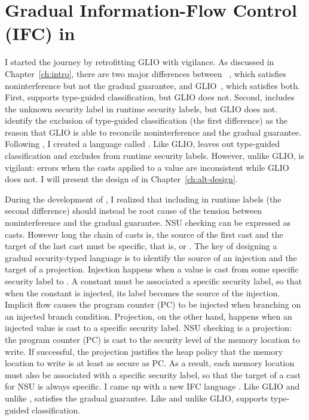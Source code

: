 \chapter{Gradual Information-Flow Control (IFC) in \Surface}
\label{ch:examples}

{\color{NavyBlue} %
I started the journey by retrofitting GLIO with vigilance. As discussed in
Chapter~\ref{ch:intro}, there are two major differences between
\GSLRef~\parencite{Toro:2018aa}, which satisfies noninterference but not the
gradual guarantee, and GLIO~\parencite{Amorim:2020aa}, which satisfies both.
First, \GSLRef supports type-guided classification, but GLIO does not. Second,
\GSLRef includes the unknown security label \unk in runtime security labels, but
GLIO does not. \textcite{Amorim:2020aa} identify the exclusion of type-guided
classification (the first difference) as the reason that GLIO is able to
reconcile noninterference and the gradual guarantee. Following
\textcite{Amorim:2020aa}, I created a language called \SurfaceOld. Like GLIO,
\SurfaceOld leaves out type-guided classification and excludes \unk from runtime
security labels. However, unlike GLIO, \SurfaceOld is vigilant: \SurfaceOld
errors when the casts applied to a value are inconsistent while GLIO does not. I
will present the design of \SurfaceOld in Chapter~\ref{ch:alt-design}.

During the development of \SurfaceOld, I realized that including \unk in runtime
labels (the second difference) should instead be root cause of the tension
between noninterference and the gradual guarantee. NSU checking can be expressed
as casts. However long the chain of casts is, the source of the first cast and
the target of the last cast must be specific, that is, \low or \high. The key of
designing a gradual security-typed language is to identify the source of an
injection and the target of a projection. Injection happens when a value is cast
from some specific security label to \unk. A constant must be associated a
specific security label, so that when the constant is injected, its label
becomes the source of the injection. Implicit flow causes the program counter
(PC) to be injected when branching on an injected branch condition. Projection,
on the other hand, happens when an injected value is cast to a specific security
label. NSU checking is a projection: the program counter (PC) is cast to the
security level of the memory location to write. If successful, the projection
justifies the heap policy that the memory location to write is at least as
secure as PC. As a result, each memory location must also be associated with a
specific security label, so that the target of a cast for NSU is always
specific. I came up with a new IFC language \Surface. Like GLIO and unlike
\GSLRef, \Surface satisfies the gradual guarantee. Like \GSLRef and unlike GLIO,
\Surface supports type-guided classification.

}
